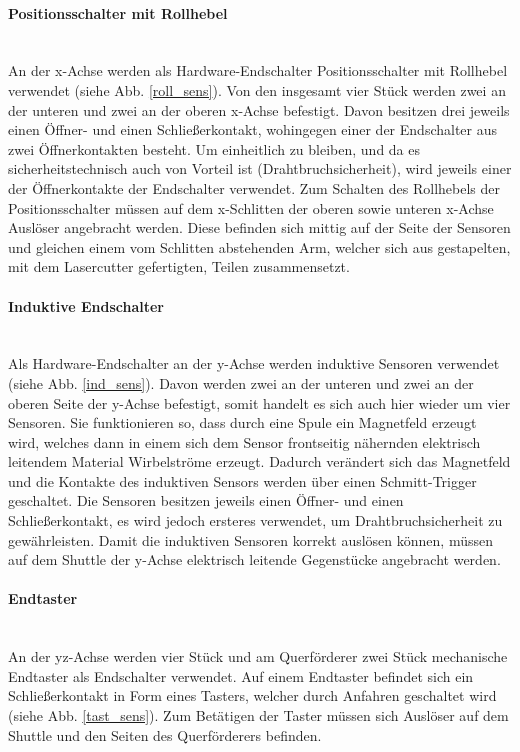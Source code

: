 \paragraph{Positionsschalter mit Rollhebel} \mbox{}\\
An der x-Achse werden als Hardware-Endschalter Positionsschalter mit Rollhebel verwendet (siehe Abb. \ref{roll_sens}). Von den insgesamt vier Stück werden zwei an der unteren und zwei an der oberen x-Achse befestigt. Davon besitzen drei jeweils einen Öffner- und einen Schließerkontakt, wohingegen einer der Endschalter aus zwei Öffnerkontakten besteht. Um einheitlich zu bleiben, und da es sicherheitstechnisch auch von Vorteil ist (Drahtbruchsicherheit), wird jeweils einer der Öffnerkontakte der Endschalter verwendet. Zum Schalten des Rollhebels der Positionsschalter müssen auf dem x-Schlitten der oberen sowie unteren x-Achse Auslöser angebracht werden. Diese befinden sich mittig auf der Seite der Sensoren und gleichen einem vom Schlitten abstehenden Arm, welcher sich aus gestapelten, mit dem Lasercutter gefertigten, Teilen zusammensetzt.

\paragraph{Induktive Endschalter} \mbox{}\\
Als Hardware-Endschalter an der y-Achse werden induktive Sensoren verwendet (siehe Abb. \ref{ind_sens}). Davon werden zwei an der unteren und zwei an der oberen Seite der y-Achse befestigt, somit handelt es sich auch hier wieder um vier Sensoren. Sie funktionieren so, dass durch eine Spule ein Magnetfeld erzeugt wird, welches dann in einem sich dem Sensor frontseitig nähernden elektrisch leitendem Material Wirbelströme erzeugt. Dadurch verändert sich das Magnetfeld und die Kontakte des induktiven Sensors werden über einen Schmitt-Trigger geschaltet. Die Sensoren besitzen jeweils einen Öffner- und einen Schließerkontakt, es wird jedoch ersteres verwendet, um Drahtbruchsicherheit zu gewährleisten. Damit die induktiven Sensoren korrekt auslösen können, müssen auf dem Shuttle der y-Achse elektrisch leitende Gegenstücke angebracht werden.

\paragraph{Endtaster} \mbox{}\\
An der yz-Achse werden vier Stück und am Querförderer zwei Stück mechanische Endtaster als Endschalter verwendet. Auf einem Endtaster befindet sich ein Schließerkontakt in Form eines Tasters, welcher durch Anfahren geschaltet wird (siehe Abb. \ref{tast_sens}). Zum Betätigen der Taster müssen sich Auslöser auf dem Shuttle und den Seiten des Querförderers befinden.\\

